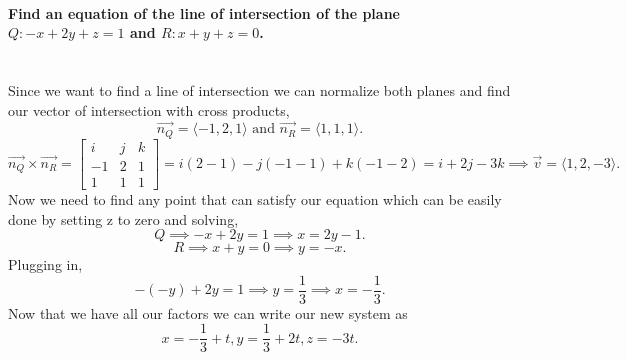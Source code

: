 \paragraph{Find an equation of the line of intersection of the plane $ Q:-x+2y+z=1 $ and $ R:x+y+z=0 $. \\ \\}
Since we want to find a line of intersection we can normalize both planes and find our vector of intersection with cross products,
\[
\vec{ n_Q }= \langle -1,2,1 \rangle \text{ and } \vec{ n_R }= \langle 1,1,1 \rangle
.\] 
\[
\vec{ n_Q } \times \vec{ n_R } = \begin{bmatrix} i & j & k \\ -1 & 2 & 1 \\ 1 & 1 & 1 \end{bmatrix} = i\left( 2-1 \right) -j\left( -1-1 \right) +k\left( -1-2 \right) = i+2j-3k \implies \vec{ v }= \langle 1,2,-3 \rangle
.\] 
Now we need to find any point that can satisfy our equation which can be easily done by setting z to zero and solving,
\[
Q \implies -x+2y=1 \implies x=2y-1
.\] 
\[
R \implies x+y=0 \implies y= -x
.\] 
Plugging in,
\[
	-\left( -y \right) +2y=1 \implies y= \frac{ 1 }{ 3 }  \implies x= -\frac{ 1 }{ 3 } 
.\] 
Now that we have all our factors we can write our new system as
\[
x=-\frac{ 1 }{ 3 } +t, y=\frac{ 1 }{ 3 } +2t, z=-3t
.\] 

